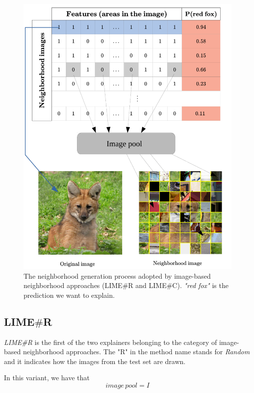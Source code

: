 \documentclass[12pt, twoside, a4paper]{report}
\begin{document}
\begin{figure}
\includegraphics[width=\textwidth]{images/image-based_neigh.png} 
\caption{The neighborhood generation process adopted by image-based neighborhood approaches (LIME\#R and LIME\#C). \textit{"red fox"} is the prediction we want to explain.}
\label{fig:img-based_neigh}
\end{figure}

\subsection{LIME$\#$R}

\textit{LIME\#R} is the first of the two explainers belonging to the category of image-based neighborhood approaches. The "R" in the method name stands for \textit{Random} and it indicates how the images from the test set are drawn.

In this variant, we have that
\begin{equation}
image\,pool = I
\label{eqn:image_pool}
\end{equation}
\end{document}
